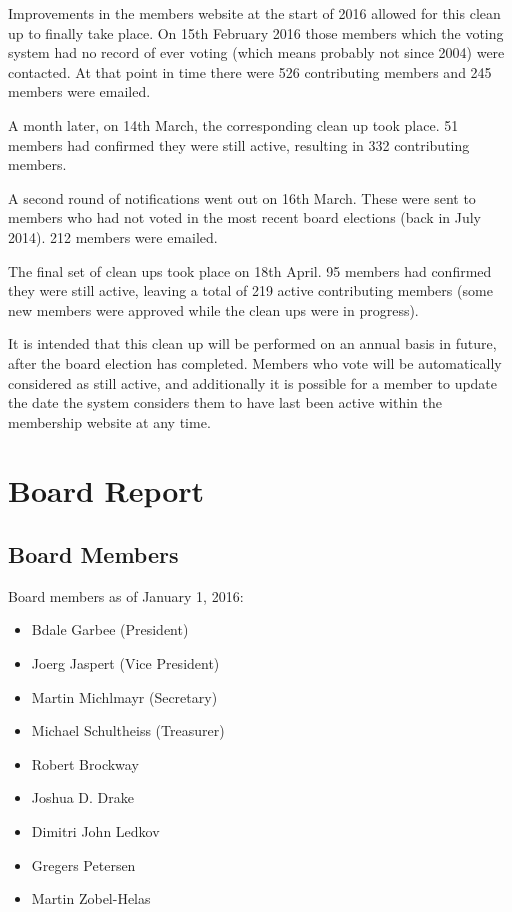 \documentclass[letterpaper]{report}
\begin{document}
Improvements in the members website at the start of 2016 allowed for this clean up to finally take place. On 15th February 2016 those members which the voting system had no record of ever voting (which means probably not since 2004) were contacted. At that point in time there were 526 contributing members and 245 members were emailed.

A month later, on 14th March, the corresponding clean up took place. 51 members had confirmed they were still active, resulting in 332 contributing members.

A second round of notifications went out on 16th March. These were sent to members who had not voted in the most recent board elections (back in July 2014). 212 members were emailed.

The final set of clean ups took place on 18th April. 95 members had confirmed they were still active, leaving a total of 219 active contributing members (some new members were approved while the clean ups were in progress).

It is intended that this clean up will be performed on an annual basis in future, after the board election has completed. Members who vote will be automatically considered as still active, and additionally it is possible for a member to update the date the system considers them to have last been active within the membership website at any time.

\chapter{Board Report}
\section{Board Members}

Board members as of January 1, 2016:

\begin{itemize}
\item Bdale Garbee (President)
\item Joerg Jaspert (Vice President)
\item Martin Michlmayr (Secretary)
\item Michael Schultheiss (Treasurer)
\item Robert Brockway
\item Joshua D. Drake
\item Dimitri John Ledkov
\item Gregers Petersen
\item Martin Zobel-Helas
\end{itemize}
\end{document}
